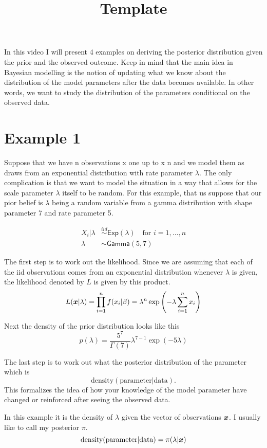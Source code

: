 \documentclass{article}
\begin{document}
\title{Template}
\maketitle

In this video I will present 4 examples on deriving the posterior distribution given the prior and the observed outcome. Keep in mind that the main idea in Bayesian modelling is the notion of updating what we know about the distribution of the model parameters after the data becomes available. In other words, we want to study the distribution of the parameters conditional on the observed data.



\section*{Example 1}
Suppose that we have n observations x one up to x n and we model them as draws from an exponential distribution with rate parameter $\lambda$. The only complication is that we want to model the situation in a way that allows for the scale parameter $\lambda$ itself to be random. For this example, that us suppose that our pior belief is $\lambda$ being a random variable from a gamma distribution with shape parameter 7 and rate parameter 5.

\[
\begin{split}
X_i|\lambda&\overset{iid}{\sim}\mathsf{Exp}(\lambda)\quad\mbox{for }i=1,\ldots,n\\
\lambda&\sim\mathsf{Gamma}(5,7)
\end{split}
\]

The first step is to work out the likelihood. Since we are assuming that each of the iid observations comes from an exponential distribution whenever $\lambda$ is given, the likelihood denoted by $L$ is given by this product. 
\[
L(\boldsymbol{x}|\lambda)=\prod_{i=1}^nf(x_i|\beta)=\lambda^n\exp\left(-\lambda\sum_{i=1}^nx_i\right)
\]

Next the density of the prior distribution looks like this
\[
p(\lambda)=\frac{5^7}{\Gamma(7)}\lambda^{7-1}\exp\left(-5\lambda\right)
\]

The last step is to work out what the posterior distribution of the parameter which is
\[
\mbox{density}(\mbox{parameter}|\mbox{data}).
\]
This formalizes the idea of how your knowledge of the model parameter have changed or reinforced after seeing the observed data.

In this example it is the density of $\lambda$ given the vector of observations $\boldsymbol{x}$. I usually like to call my posterior $\pi$.
\[
\mbox{density}(\mbox{parameter}|\mbox{data})=\pi(\lambda|\boldsymbol{x})
\]
\end{document}
